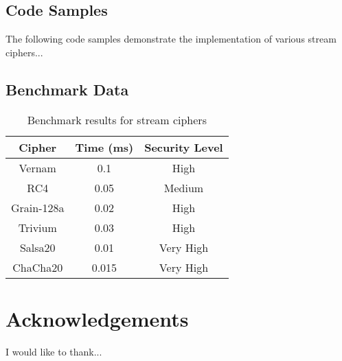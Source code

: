 \section{Code Samples}
The following code samples demonstrate the implementation of various stream ciphers...

\section{Benchmark Data}
\begin{table}[h!]
\centering
\begin{tabular}{|c|c|c|}
\hline
Cipher & Time (ms) & Security Level \\
\hline
Vernam & 0.1 & High \\
RC4 & 0.05 & Medium \\
Grain-128a & 0.02 & High \\
Trivium & 0.03 & High \\
Salsa20 & 0.01 & Very High \\
ChaCha20 & 0.015 & Very High \\
\hline
\end{tabular}
\caption{Benchmark results for stream ciphers}
\end{table}

\chapter{Acknowledgements}
I would like to thank...
